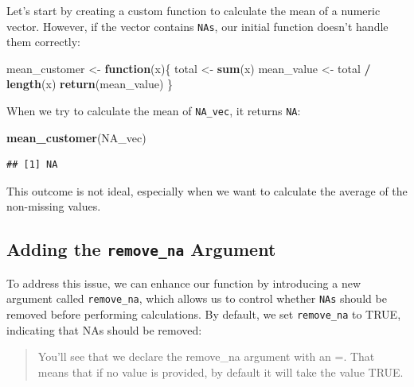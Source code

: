 \documentclass[
]{book}
\newenvironment{Shaded}{\begin{snugshade}}{\end{snugshade}}
\newcommand{\ControlFlowTok}[1]{\textcolor[rgb]{0.13,0.29,0.53}{\textbf{#1}}}
\newcommand{\FunctionTok}[1]{\textcolor[rgb]{0.13,0.29,0.53}{\textbf{#1}}}
\newcommand{\NormalTok}[1]{#1}
\newcommand{\OtherTok}[1]{\textcolor[rgb]{0.56,0.35,0.01}{#1}}
\newcommand{\SpecialCharTok}[1]{\textcolor[rgb]{0.81,0.36,0.00}{\textbf{#1}}}
\begin{document}
Let's start by creating a custom function to calculate the mean of a numeric vector. However, if the vector contains \texttt{NAs}, our initial function doesn't handle them correctly:

\begin{Shaded}
\begin{Highlighting}[]
\NormalTok{mean\_customer }\OtherTok{\textless{}{-}} \ControlFlowTok{function}\NormalTok{(x)\{}
\NormalTok{    total }\OtherTok{\textless{}{-}} \FunctionTok{sum}\NormalTok{(x)}
\NormalTok{    mean\_value }\OtherTok{\textless{}{-}}\NormalTok{ total }\SpecialCharTok{/} \FunctionTok{length}\NormalTok{(x)}
    \FunctionTok{return}\NormalTok{(mean\_value)}
\NormalTok{\}}
\end{Highlighting}
\end{Shaded}

When we try to calculate the mean of \texttt{NA\_vec}, it returns \texttt{NA}:

\begin{Shaded}
\begin{Highlighting}[]
\FunctionTok{mean\_customer}\NormalTok{(NA\_vec)}
\end{Highlighting}
\end{Shaded}

\begin{verbatim}
## [1] NA
\end{verbatim}

This outcome is not ideal, especially when we want to calculate the average of the non-missing values.

\hypertarget{adding-the-remove_na-argument}{%
\subsection{\texorpdfstring{Adding the \texttt{remove\_na} Argument}{Adding the remove\_na Argument}}\label{adding-the-remove_na-argument}}

To address this issue, we can enhance our function by introducing a new argument called \texttt{remove\_na}, which allows us to control whether \texttt{NAs} should be removed before performing calculations. By default, we set \texttt{remove\_na} to TRUE, indicating that NAs should be removed:

\begin{quote}
You'll see that we declare the remove\_na argument with an =. That means that if no value is provided, by default it will take the value TRUE.
\end{quote}
\end{document}
